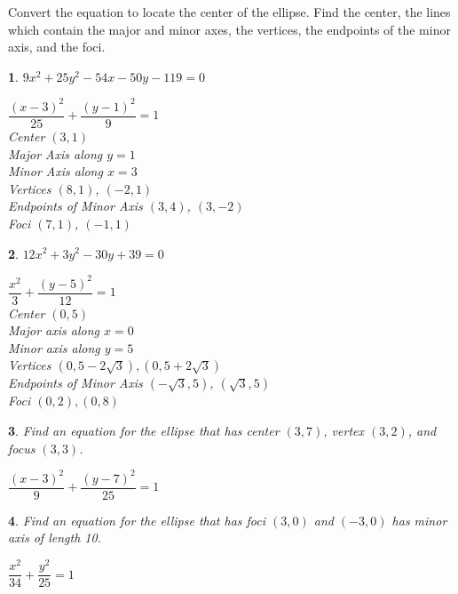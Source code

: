 \documentclass{amsbook}
\newtheorem{exc}{}
\newenvironment{ex}{\begin{exc}\normalfont}{\end{exc}}
\numberwithin{section}{chapter}
\numberwithin{equation}{chapter}
\begin{document}
Convert the equation to locate the center of the ellipse. Find the center, the lines which contain the major and minor axes, the vertices, the endpoints of the minor axis, and the foci.
\begin{multicols}{2}
\begin{ex}
	$9x^2+25y^2-54x-50y-119=0$
	\begin{sol}
		$\dfrac{(x-3)^2}{25} + \dfrac{\left(y-1\right)^2}{9} = 1$\\
		Center  $\left(3, 1 \right)$\\
		Major Axis along $y=1$\\
		Minor Axis along $x=3$\\
		Vertices  $\left( 8, 1   \right)$, $(-2, 1)$\\
		Endpoints of Minor Axis $\left(3,4\right)$, $\left(3,-2\right)$\\
		Foci $\left(7,1 \right)$, $\left(-1, 1\right)$
	\end{sol}
\end{ex}

\begin{ex}
	$12x^{2} + 3y^{2} - 30y + 39 = 0$
	\begin{sol}
	$\dfrac{x^{2}}{3} + \dfrac{(y - 5)^{2}}{12} = 1$\\
	Center $(0, 5)$\\
	Major axis along $x = 0$\\
	Minor axis along $y = 5$\\
	Vertices $(0, 5 - 2\sqrt{3}), (0, 5 + 2\sqrt{3})$\\
	Endpoints of Minor Axis $(-\sqrt{3},5)$, $(\sqrt{3},5)$\\
	Foci $(0, 2), (0, 8)$	
	\end{sol}
\end{ex}

\end{multicols}

\begin{ex}
	Find an equation for the ellipse that has center $(3,7)$, vertex $(3,2)$, and focus $(3,3)$.
	\begin{sol}
		$\dfrac{(x-3)^2}{9}+\dfrac{(y-7)^2}{25} = 1$
	\end{sol}
\end{ex}


\begin{ex}
	Find an equation for the ellipse that has foci $(3,0)$ and $(-3,0)$ has minor axis of length 10.
	\begin{sol}
		$\dfrac{x^2}{34}+\dfrac{y^2}{25}=1$
	\end{sol}
\end{ex}
\end{document}
